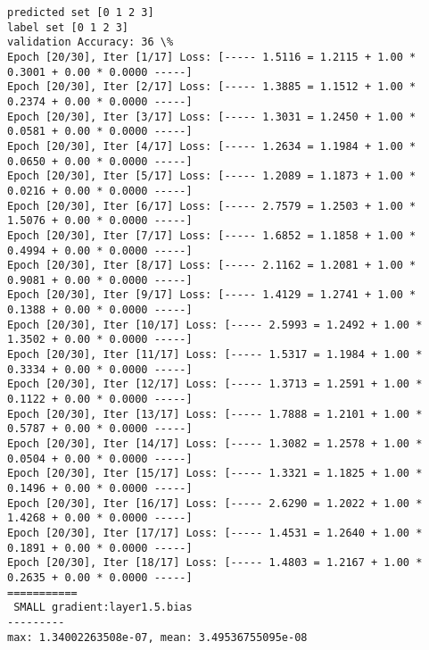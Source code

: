 \documentclass[11pt]{article}
\begin{document}
    \begin{Verbatim}[commandchars=\\\{\}]
predicted set [0 1 2 3]
label set [0 1 2 3]
validation Accuracy: 36 \%
Epoch [20/30], Iter [1/17] Loss: [----- 1.5116 = 1.2115 + 1.00 * 0.3001 + 0.00 * 0.0000 -----]
Epoch [20/30], Iter [2/17] Loss: [----- 1.3885 = 1.1512 + 1.00 * 0.2374 + 0.00 * 0.0000 -----]
Epoch [20/30], Iter [3/17] Loss: [----- 1.3031 = 1.2450 + 1.00 * 0.0581 + 0.00 * 0.0000 -----]
Epoch [20/30], Iter [4/17] Loss: [----- 1.2634 = 1.1984 + 1.00 * 0.0650 + 0.00 * 0.0000 -----]
Epoch [20/30], Iter [5/17] Loss: [----- 1.2089 = 1.1873 + 1.00 * 0.0216 + 0.00 * 0.0000 -----]
Epoch [20/30], Iter [6/17] Loss: [----- 2.7579 = 1.2503 + 1.00 * 1.5076 + 0.00 * 0.0000 -----]
Epoch [20/30], Iter [7/17] Loss: [----- 1.6852 = 1.1858 + 1.00 * 0.4994 + 0.00 * 0.0000 -----]
Epoch [20/30], Iter [8/17] Loss: [----- 2.1162 = 1.2081 + 1.00 * 0.9081 + 0.00 * 0.0000 -----]
Epoch [20/30], Iter [9/17] Loss: [----- 1.4129 = 1.2741 + 1.00 * 0.1388 + 0.00 * 0.0000 -----]
Epoch [20/30], Iter [10/17] Loss: [----- 2.5993 = 1.2492 + 1.00 * 1.3502 + 0.00 * 0.0000 -----]
Epoch [20/30], Iter [11/17] Loss: [----- 1.5317 = 1.1984 + 1.00 * 0.3334 + 0.00 * 0.0000 -----]
Epoch [20/30], Iter [12/17] Loss: [----- 1.3713 = 1.2591 + 1.00 * 0.1122 + 0.00 * 0.0000 -----]
Epoch [20/30], Iter [13/17] Loss: [----- 1.7888 = 1.2101 + 1.00 * 0.5787 + 0.00 * 0.0000 -----]
Epoch [20/30], Iter [14/17] Loss: [----- 1.3082 = 1.2578 + 1.00 * 0.0504 + 0.00 * 0.0000 -----]
Epoch [20/30], Iter [15/17] Loss: [----- 1.3321 = 1.1825 + 1.00 * 0.1496 + 0.00 * 0.0000 -----]
Epoch [20/30], Iter [16/17] Loss: [----- 2.6290 = 1.2022 + 1.00 * 1.4268 + 0.00 * 0.0000 -----]
Epoch [20/30], Iter [17/17] Loss: [----- 1.4531 = 1.2640 + 1.00 * 0.1891 + 0.00 * 0.0000 -----]
Epoch [20/30], Iter [18/17] Loss: [----- 1.4803 = 1.2167 + 1.00 * 0.2635 + 0.00 * 0.0000 -----]
===========
 SMALL gradient:layer1.5.bias
---------
max: 1.34002263508e-07, mean: 3.49536755095e-08

    \end{Verbatim}

    \begin{center}
    \end{center}
    { \hspace*{\fill} \\}
    
    \begin{center}
    \end{center}
    { \hspace*{\fill} \\}
    
\end{document}
